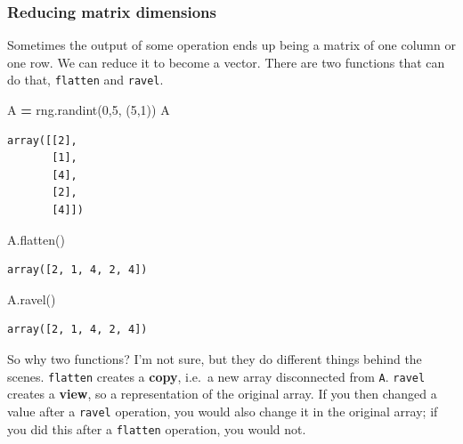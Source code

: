 \documentclass[
  letterpaper,
]{scrbook}
\newenvironment{Shaded}{\begin{snugshade}}{\end{snugshade}}
\newcommand{\DecValTok}[1]{\textcolor[rgb]{0.00,0.00,0.81}{#1}}
\newcommand{\NormalTok}[1]{#1}
\newcommand{\OperatorTok}[1]{\textcolor[rgb]{0.81,0.36,0.00}{\textbf{#1}}}
\begin{document}
\hypertarget{reducing-matrix-dimensions}{%
\subsubsection{Reducing matrix dimensions}\label{reducing-matrix-dimensions}}

Sometimes the output of some operation ends up being a matrix of one column or one row. We can reduce it to become a vector. There are two functions that can do that, \texttt{flatten} and \texttt{ravel}.

\begin{Shaded}
\begin{Highlighting}[]
\NormalTok{A }\OperatorTok{=}\NormalTok{ rng.randint(}\DecValTok{0}\NormalTok{,}\DecValTok{5}\NormalTok{, (}\DecValTok{5}\NormalTok{,}\DecValTok{1}\NormalTok{))}
\NormalTok{A}
\end{Highlighting}
\end{Shaded}

\begin{verbatim}
array([[2],
       [1],
       [4],
       [2],
       [4]])
\end{verbatim}

\begin{Shaded}
\begin{Highlighting}[]
\NormalTok{A.flatten()}
\end{Highlighting}
\end{Shaded}

\begin{verbatim}
array([2, 1, 4, 2, 4])
\end{verbatim}

\begin{Shaded}
\begin{Highlighting}[]
\NormalTok{A.ravel()}
\end{Highlighting}
\end{Shaded}

\begin{verbatim}
array([2, 1, 4, 2, 4])
\end{verbatim}

So why two functions? I'm not sure, but they do different things behind the scenes. \texttt{flatten} creates a \textbf{copy}, i.e.~a new array disconnected from \texttt{A}. \texttt{ravel} creates a \textbf{view}, so a representation of the original array. If you then changed a value after a \texttt{ravel} operation, you would also change it in the original array; if you did this after a \texttt{flatten} operation, you would not.
\end{document}
